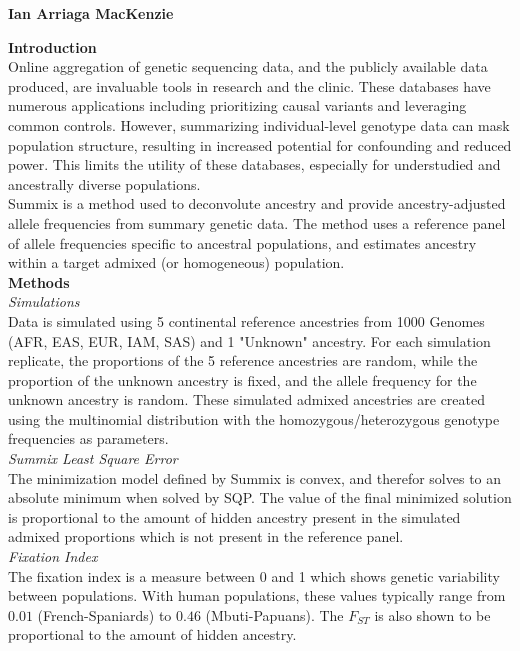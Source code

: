 \documentclass[11pt,a4paper]{article}
\begin{document}
\begin{center}
\textbf{Ian Arriaga MacKenzie}
\end{center}

\textbf{Introduction}\\

Online aggregation of genetic sequencing data, and the publicly available data produced, are invaluable tools in research and the clinic. These databases have numerous applications including prioritizing causal variants and leveraging common controls. However, summarizing individual-level genotype data can mask population structure, resulting in increased potential for confounding and reduced power. This limits the utility of these databases, especially for understudied and ancestrally diverse populations.\\

Summix is a method used to deconvolute ancestry and provide ancestry-adjusted allele frequencies from summary genetic data. The method uses a reference panel of allele frequencies specific to ancestral populations, and estimates ancestry within a target admixed (or homogeneous) population.\\

\textbf{Methods}\\

\textit{Simulations}\\
Data is simulated using 5 continental reference ancestries from 1000 Genomes (AFR, EAS, EUR, IAM, SAS) and 1 "Unknown" ancestry. For each simulation replicate, the proportions of the 5 reference ancestries are random, while the proportion of the unknown ancestry is fixed, and the allele frequency for the unknown ancestry is random. These simulated admixed ancestries are created using the multinomial distribution with the homozygous/heterozygous genotype frequencies as parameters.\\

\textit{Summix Least Square Error}\\
The minimization model defined by Summix is convex, and therefor solves to an absolute minimum when solved by SQP.  The value of the final minimized solution is proportional to the amount of hidden ancestry present in the simulated admixed proportions which is not present in the reference panel.\\

\textit{Fixation Index}\\
The fixation index is a measure between 0 and 1 which shows genetic variability between populations. With human populations, these values typically range from $0.01$ (French-Spaniards) to $0.46$ (Mbuti-Papuans).  The $F_{ST}$ is also shown to be proportional to the amount of hidden ancestry.\\
\end{document}
